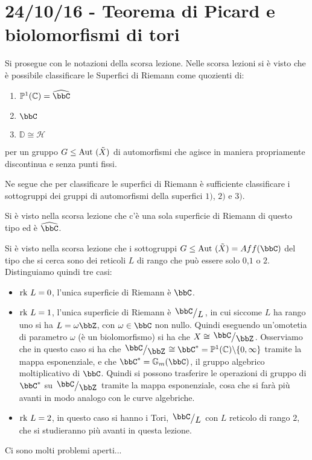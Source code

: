 
\chapter{24/10/16 - Teorema di Picard e biolomorfismi di tori}
\justify

Si prosegue con le notazioni della scorsa lezione.
Nelle scorsa lezioni si è visto che è possibile classificare le Superfici di Riemann come quozienti di:
\begin{enumerate}
\item $\mathbb{P}^1(\mathbb{C})=\hat{\bbC}$
\item $\bbC$
\item $\mathbb{D} \cong \mathcal{H}$
\end{enumerate}
per un gruppo $G\le\text{Aut }(\tilde{X})$ di automorfismi che agisce in maniera propriamente discontinua e senza punti fissi.

Ne segue che per classificare le superfici di Riemann è sufficiente classificare i sottogruppi dei gruppi di automorfismi della superfici $1)$, $2)$ e $3)$.

 Si è visto nella scorsa lezione che c'è una sola superficie di Riemann di questo tipo ed è $\hat{\bbC}$.

 Si è visto nella scorsa lezione che i sottogruppi $G\le\Aut(\tilde{X})=Aff(\bbC)$ del tipo che si cerca sono dei reticoli $L$ di rango che può essere solo $0$,$1$ o $2$. Distinguiamo quindi tre casi:
\begin{itemize}
\item $\mbox{rk } L=0$, l'unica superficie di Riemann è $\bbC$.
\item $\mbox{rk } L=1$, l'unica superficie di Riemann è $\quotient{\bbC}{L}$, in cui siccome $L$ ha rango uno si ha $L=\omega \bbZ$, con $\omega\in\bbC$ non nullo. Quindi eseguendo un'omotetia di parametro $\omega$ (è un biolomorfismo) si ha che $X\cong \quotient{\bbC}{\bbZ}$.
Osserviamo che in questo caso si ha che $\quotient{\bbC}{\bbZ}\cong \bbC^{*}=\mathbb{P}^1(\mathbb{C})\minus\{0,\infty\}$ tramite la mappa esponenziale, e che $\bbC^{*}=\mathbb{G}_m(\bbC)$, il gruppo algebrico moltiplicativo di $\bbC$. Quindi si possono trasferire le operazioni di gruppo di $\bbC^{*}$ su $\quotient{\bbC}{\bbZ}$ tramite la mappa esponenziale, cosa che si farà più avanti in modo analogo con le curve algebriche.
\item $\mbox{rk } L=2$, in questo caso si hanno i Tori, $\quotient{\bbC}{L}$ con $L$ reticolo di rango $2$, che si studieranno più avanti in questa lezione.
\end{itemize}
 Ci sono molti problemi aperti...

